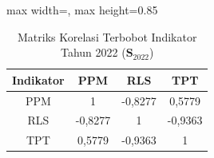 \begin{table}[H]
\centering
\caption{Matriks Korelasi Terbobot Indikator Tahun 2022 ($\mathbf{S}_{2022}$)} \label{tab:sample2matriks_intra_loading_2022}
\begin{adjustbox}{max width=\textwidth, max height=0.85\textheight}
\begin{tabular}{|c|c|c|c|}
\hline
\textbf{Indikator} & \textbf{PPM} & \textbf{RLS} & \textbf{TPT} \\
\hline
PPM & 1 & -0,8277 & 0,5779 \\
RLS & -0,8277 & 1 & -0,9363 \\
TPT & 0,5779 & -0,9363 & 1 \\
\hline
\end{tabular}
\end{adjustbox}
\end{table}